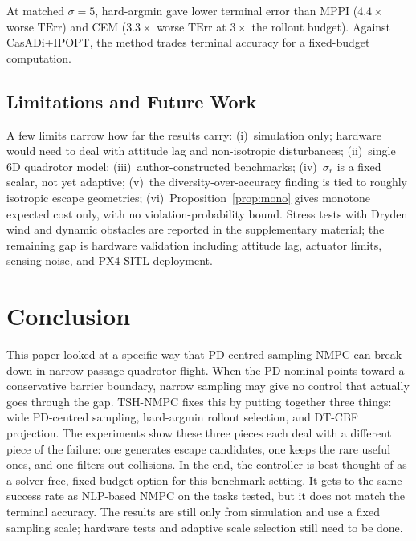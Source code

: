 \documentclass[11pt,onecolumn,a4paper]{article}
\newcommand{\TErr}{\mathrm{TErr}}
\begin{document}
At matched $\sigma = 5$, hard-argmin gave lower terminal error than
MPPI ($4.4\times$ worse $\TErr$) and CEM ($3.3\times$ worse $\TErr$
at $3\times$ the rollout budget). Against CasADi+IPOPT, the method
trades terminal accuracy for a fixed-budget computation.

\subsection{Limitations and Future Work}\label{sec:limitations}

A few limits narrow how far the results carry:
(i)~simulation only; hardware would need to deal with attitude lag
and non-isotropic disturbances; (ii)~single 6D quadrotor model;
(iii)~author-constructed benchmarks; (iv)~$\sigma_r$ is a fixed
scalar, not yet adaptive; (v)~the diversity-over-accuracy finding
is tied to roughly isotropic escape geometries;
(vi)~Proposition~\ref{prop:mono} gives monotone expected cost only,
with no violation-probability bound. Stress tests with Dryden wind
and dynamic obstacles are reported in the supplementary material; the
remaining gap is hardware validation including attitude lag, actuator
limits, sensing noise, and PX4 SITL deployment.


\section{Conclusion}\label{sec:conclusion}

This paper looked at a specific way that PD-centred sampling NMPC
can break down in narrow-passage quadrotor flight. When the PD
nominal points toward a conservative barrier boundary, narrow
sampling may give no control that actually goes through the gap.
TSH-NMPC fixes this by putting together three things: wide
PD-centred sampling, hard-argmin rollout selection, and DT-CBF
projection. The experiments show these three pieces each deal with
a different piece of the failure: one generates escape candidates,
one keeps the rare useful ones, and one filters out collisions. In
the end, the controller is best thought of as a solver-free,
fixed-budget option for this benchmark setting. It gets to the same
success rate as NLP-based NMPC on the tasks tested, but it does not
match the terminal accuracy. The results are still only from
simulation and use a fixed sampling scale; hardware tests and
adaptive scale selection still need to be done.
\end{document}
